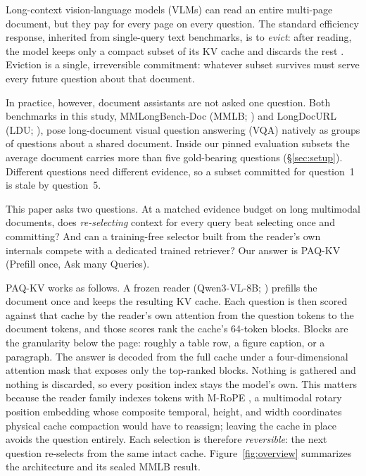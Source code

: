 \documentclass[letterpaper]{article} %
\newcommand{\paqc}{\textsc{PAQ-KV}}
\begin{document}
Long-context vision-language models (VLMs) can read an entire multi-page document, but they pay for every page on every question. The standard efficiency response, inherited from single-query text benchmarks, is to \emph{evict}: after reading, the model keeps only a compact subset of its KV cache and discards the rest \citep{li2024snapkv,zhang2023h2o,chen2024fastv,wan2024lookm,kim2025kvzip}. Eviction is a single, irreversible commitment: whatever subset survives must serve every future question about that document.

In practice, however, document assistants are not asked one question. Both benchmarks in this study, MMLongBench-Doc (MMLB; \citealp{ma2024mmlongbench}) and LongDocURL (LDU; \citealp{deng2025longdocurl}), pose long-document visual question answering (VQA) natively as groups of questions about a shared document. Inside our pinned evaluation subsets the average document carries more than five gold-bearing questions (\S\ref{sec:setup}). Different questions need different evidence, so a subset committed for question~1 is stale by question~5.

This paper asks two questions. At a matched evidence budget on long multimodal
documents, does \emph{re-selecting} context for every query beat selecting once
and committing? And can a training-free selector built from the reader's own
internals compete with a dedicated trained retriever? Our answer is \paqc{}
(Prefill once, Ask many Queries).

\paqc{} works as follows. A frozen reader (Qwen3-VL-8B; \citealp{qwen3vl2025})
prefills the document once and keeps the resulting KV cache. Each question is
then scored against that cache by the reader's own attention from the question
tokens to the document tokens, and those scores rank the cache's 64-token
blocks. Blocks are the granularity below the page: roughly a table row, a
figure caption, or a paragraph. The answer is decoded from the full
cache under a four-dimensional attention mask that exposes only the top-ranked
blocks. Nothing is gathered and nothing is discarded, so every position index
stays the model's own. This matters because the reader family indexes tokens
with M-RoPE \citep{bai2025qwen25vl}, a multimodal rotary position embedding
whose composite temporal, height, and width coordinates physical cache
compaction would have to reassign; leaving the cache in place avoids the
question entirely. Each selection is therefore \emph{reversible}: the next
question re-selects from the same intact cache. Figure~\ref{fig:overview}
summarizes the architecture and its sealed MMLB result.
\end{document}
